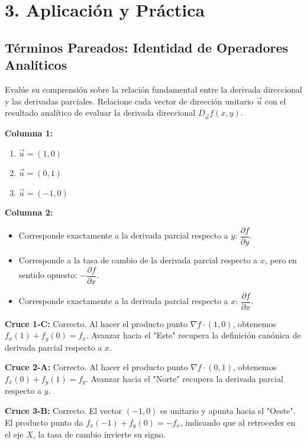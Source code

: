 \documentclass[11pt]{article}
\newenvironment{aplicacion}{%
  \section*{3. Aplicación y Práctica}%
}{}
\newenvironment{pareados}[1]{\subsection*{Términos Pareados: #1}}{\vspace{0.3cm}}
\newcommand{\columnaI}[1]{\textbf{Columna 1:}\begin{enumerate}#1\end{enumerate}}
\newcommand{\columnaII}[1]{\textbf{Columna 2:}\begin{itemize}#1\end{itemize}}
\newcommand{\pareo}[2]{\textbf{Cruce #1:} #2\par}
\begin{document}
\begin{aplicacion}
  \begin{pareados}{Identidad de Operadores Analíticos}
    Evalúe su comprensión sobre la relación fundamental entre la derivada direccional y las derivadas parciales. Relacione cada vector de dirección unitario $\vec{u}$ con el resultado analítico de evaluar la derivada direccional $D_{\vec{u}}f(x,y)$.

    \columnaI{
      \item $\vec{u} = (1,0)$
      \item $\vec{u} = (0,1)$
      \item $\vec{u} = (-1,0)$
    }

    \columnaII{
      \item Corresponde exactamente a la derivada parcial respecto a $y$: $\dfrac{\partial f}{\partial y}$.
      \item Corresponde a la tasa de cambio de la derivada parcial respecto a $x$, pero en sentido opuesto: $-\dfrac{\partial f}{\partial x}$.
      \item Corresponde exactamente a la derivada parcial respecto a $x$: $\dfrac{\partial f}{\partial x}$.
    }

    \pareo{1-C}{Correcto. Al hacer el producto punto $\nabla f \cdot (1,0)$, obtenemos $f_x(1) + f_y(0) = f_x$. Avanzar hacia el "Este" recupera la definición canónica de derivada parcial respecto a $x$.}
    \pareo{2-A}{Correcto. Al hacer el producto punto $\nabla f \cdot (0,1)$, obtenemos $f_x(0) + f_y(1) = f_y$. Avanzar hacia el "Norte" recupera la derivada parcial respecto a $y$.}
    \pareo{3-B}{Correcto. El vector $(-1,0)$ es unitario y apunta hacia el "Oeste". El producto punto da $f_x(-1) + f_y(0) = -f_x$, indicando que al retroceder en el eje $X$, la tasa de cambio invierte su signo.}
  \end{pareados}

\end{aplicacion}
\end{document}
